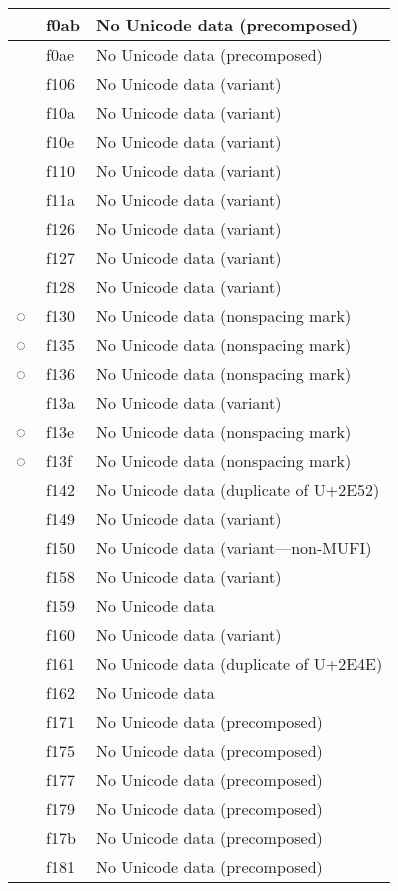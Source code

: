 \documentclass[12pt,letterpaper,openany]{book}
\begin{document}
\begin{center}
\begin{supertabular}{|m{0.25in}|m{0.5in}|m{4in}|}
 & f0ab & No Unicode data (precomposed)\\\hline
 & f0ae & No Unicode data (precomposed)\\\hline
 & f106 & No Unicode data (variant)\\\hline
 & f10a & No Unicode data (variant)\\\hline
 & f10e & No Unicode data (variant)\\\hline
 & f110 & No Unicode data (variant)\\\hline
 & f11a & No Unicode data (variant)\\\hline
 & f126 & No Unicode data (variant)\\\hline
 & f127 & No Unicode data (variant)\\\hline
 & f128 & No Unicode data (variant)\\\hline
◌ & f130 & No Unicode data (nonspacing mark)\\\hline
◌ & f135 & No Unicode data (nonspacing mark)\\\hline
◌ & f136 & No Unicode data (nonspacing mark)\\\hline
 & f13a & No Unicode data (variant)\\\hline
◌ & f13e & No Unicode data (nonspacing mark)\\\hline
◌ & f13f & No Unicode data (nonspacing mark)\\\hline
 & f142 & No Unicode data (duplicate of U+2E52)\\\hline
 & f149 & No Unicode data (variant)\\\hline
 & f150 & No Unicode data (variant---non-MUFI)\\\hline
 & f158 & No Unicode data (variant)\\\hline
 & f159 & No Unicode data\\\hline
 & f160 & No Unicode data (variant)\\\hline
 & f161 & No Unicode data (duplicate of U+2E4E)\\\hline
 & f162 & No Unicode data\\\hline
 & f171 & No Unicode data (precomposed)\\\hline
 & f175 & No Unicode data (precomposed)\\\hline
 & f177 & No Unicode data (precomposed)\\\hline
 & f179 & No Unicode data (precomposed)\\\hline
 & f17b & No Unicode data (precomposed)\\\hline
 & f181 & No Unicode data (precomposed)\\\hline

\end{supertabular}
\end{center}
\end{document}
